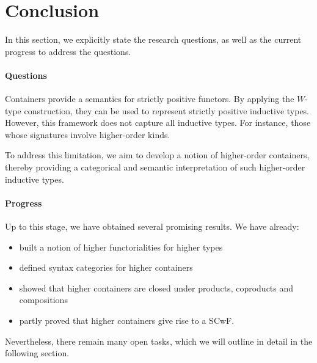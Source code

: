 \chapter{Conclusion}

In this section, we explicitly state the research questions, as well as the current progress to address the questions.

\subsubsection*{Questions}

Containers provide a semantics for strictly positive functors. By applying the $W$-type construction, they can be used to represent strictly positive inductive types. However, this framework does not capture all inductive types. For instance, those whose signatures involve higher-order kinds.

To address this limitation, we aim to develop a notion of higher-order containers, thereby providing a categorical and semantic interpretation of such higher-order inductive types.

\subsubsection*{Progress}

Up to this stage, we have obtained several promising results. We have already:

\begin{itemize}
  \item{built a notion of higher functorialities for higher types}
  \item{defined syntax categories for higher containers}
  \item{showed that higher containers are closed under products, coproducts and compositions}
  \item{partly proved that higher containers give rise to a SCwF}.
\end{itemize}

Nevertheless, there remain many open tasks, which we will outline in detail in the following section.